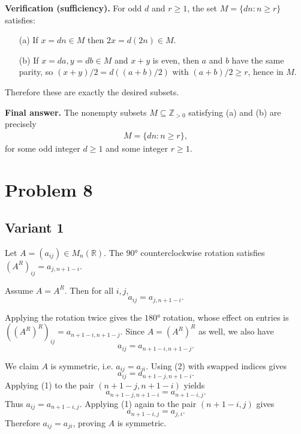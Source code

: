 \documentclass[12pt,a4paper]{article}
\theoremstyle{definition}
\begin{document}
    \textbf{Verification (sufficiency).} For odd $d$ and $r \geq 1$, the set $M = \{d n : n \geq r\}$ satisfies:
    \begin{itemize}
        \item[(a)] If $x = d n \in M$ then $2x = d(2n) \in M$.
        \item[(b)] If $x = d a, y = d b \in M$ and $x + y$ is even, then $a$ and $b$ have the same parity, so $(x + y)/2 = d((a + b)/2)$ with $(a + b)/2 \geq r$, hence in $M$.
    \end{itemize}

    Therefore these are exactly the desired subsets.

    \textbf{Final answer.}
    The nonempty subsets $M \subseteq \mathbb{Z}_{>0}$ satisfying (a) and (b) are precisely
    \begin{align}
        M = \{d n : n \geq r\},
    \end{align}
    for some odd integer $d \geq 1$ and some integer $r \geq 1$.

    \section{Problem 8}
    \subsection{Variant 1}
    Let $A = (a_{ij}) \in M_n(\mathbb{R})$. The $90°$ counterclockwise rotation satisfies
    $(A^R)_{ij} = a_{j, n+1-i}$.

    Assume $A = A^R$. Then for all $i, j$,
    \begin{equation}
        a_{ij} = a_{j, n+1-i}.
    \end{equation}

    Applying the rotation twice gives the $180°$ rotation, whose effect on entries is
    $((A^R)^R)_{ij} = a_{n+1-i, n+1-j}$.
    Since $A = (A^R)^R$ as well, we also have
    \begin{equation}
        a_{ij} = a_{n+1-i, n+1-j}.
    \end{equation}

    We claim $A$ is symmetric, i.e. $a_{ij} = a_{ji}$. Using (2) with swapped indices gives
    $$a_{ij} = a_{n+1-j, n+1-i}.$$
    Applying (1) to the pair $(n+1-j, n+1-i)$ yields
    $$a_{n+1-j, n+1-i} = a_{n+1-i, j}.$$
    Thus $a_{ij} = a_{n+1-i, j}$. Applying (1) again to the pair $(n+1-i, j)$ gives
    $$a_{n+1-i, j} = a_{j, i}.$$
    Therefore $a_{ij} = a_{ji}$, proving $A$ is symmetric.
\end{document}
